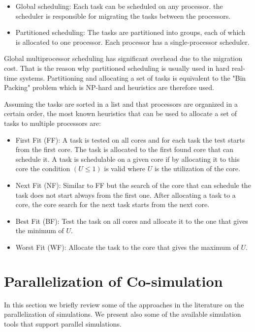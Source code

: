 \begin{itemize}
\item Global scheduling: Each task can be scheduled on any processor. the scheduler is responsible for migrating the tasks between the processors.
\item Partitioned scheduling: The tasks are partitioned into groups, each of which is allocated to one processor. Each processor has a single-processor scheduler. 
\end{itemize}
Global multiprocessor scheduling has significant overhead due to the migration cost. That is the reason why partitioned scheduling is usually used in hard real-time systems. Partitioning and allocating a set of tasks is equivalent to the "Bin Packing" problem which is NP-hard and heuristics are therefore used. 

Assuming the tasks are sorted in a list and that processors are organized in a certain order, the most known heuristics that can be used to allocate a set of tasks to multiple processors are:

\begin{itemize}
\item First Fit (FF): A task is tested on all cores and for each task the test starts from the first core. The task is allocated to the first found core that can schedule it. A task is schedulable on a given core if by allocating it to this core the condition $(U\leq1)$ is valid where $U$ is the utilization of the core.
\item Next Fit (NF): Similar to FF but the search of the core that can schedule the task does not start always from the first one. After allocating a task to a core, the core search for the next task starts from the next core.
\item Best Fit (BF): Test the task on all cores and allocate it to the one that gives the minimum of $U$.
\item Worst Fit (WF): Allocate the task to the core that gives the maximum of $U$.
\end{itemize}
  
\section{Parallelization of Co-simulation}

In this section we briefly review some of the approaches in the literature on the parallelization of simulations. We present also some of the available simulation tools that support parallel simulations.

